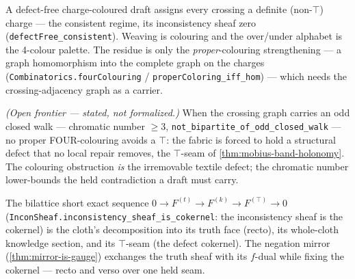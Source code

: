 \begin{theorem}\label{thm:proper-colouring-is-defectfree}\leanok{}
A defect-free charge-coloured draft assigns every crossing a definite (non-$\top$) charge --- the
consistent regime, its inconsistency sheaf zero (\texttt{defectFree\_consistent}). Weaving is
colouring and the over/under alphabet is the 4-colour palette. The residue is only the
\emph{proper}-colouring strengthening --- a graph homomorphism into the complete graph on the
charges (\texttt{Combinatorics.fourColouring} / \texttt{properColoring\_iff\_hom}) --- which needs
the crossing-adjacency graph as a carrier.
\end{theorem}

\begin{theorem}\label{thm:chromatic-obstruction-structural-defect}\notready{}
\emph{(Open frontier --- stated, not formalized.)} When the crossing graph carries an odd
closed walk --- chromatic number $\ge 3$, \texttt{not\_bipartite\_of\_odd\_closed\_walk} --- no
proper FOUR-colouring avoids a $\top$: the fabric is forced to hold a structural defect that no
local repair removes, the $\top$-seam of \cref{thm:mobius-band-holonomy}. The colouring
obstruction \emph{is} the irremovable textile defect; the chromatic number lower-bounds the
held contradiction a draft must carry.
\end{theorem}

\begin{theorem}\label{thm:recto-verso-ses}\leanok{}
The bilattice short exact sequence
$0 \to F^{(t)} \to F^{(k)} \to F^{(\top)} \to 0$ (\texttt{InconSheaf.inconsistency\_sheaf\_is\_cokernel}:
the inconsistency sheaf is the cokernel) is the cloth's decomposition into its truth face
(recto), its whole-cloth knowledge section, and its $\top$-seam (the defect cokernel). The
negation mirror (\cref{thm:mirror-is-gauge}) exchanges the truth sheaf with its $f$-dual while
fixing the cokernel --- recto and verso over one held seam.
\end{theorem}
